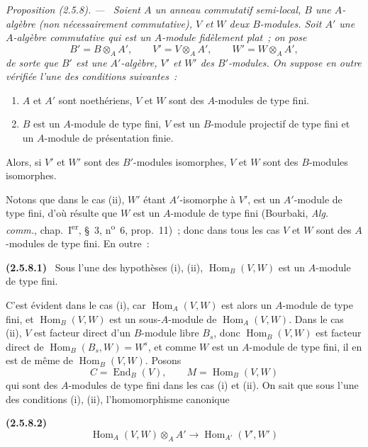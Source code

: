 \documentclass[10pt,oneside]{book}
\newenvironment{env}[1][]{\par\medskip\noindent\textbf{(#1)}\ }{\par}
\newenvironment{proposition}[1][]{%
  \par\medskip\noindent\itshape Proposition (#1). ---\ }{\par}
\begin{document}
\begin{proposition}[2.5.8]
\label{IV.2.5.8-fr}
Soient $A$ un anneau commutatif semi-local, $B$ une $A$-algèbre (non
nécessairement commutative), $V$ et $W$ deux $B$-modules. Soit $A'$ une
$A$-algèbre commutative qui est un $A$-module fidèlement plat~; on pose
\[
B'=B\otimes_A A',\qquad V'=V\otimes_A A',\qquad W'=W\otimes_A A',
\]
de sorte que $B'$ est une $A'$-algèbre, $V'$ et $W'$ des $B'$-modules. On
suppose en outre vérifiée l'une des conditions suivantes~:
\begin{enumerate}
\item[(i)] $A$ et $A'$ sont noethériens, $V$ et $W$ sont des $A$-modules de
type fini.
\item[(ii)] $B$ est un $A$-module de type fini, $V$ est un $B$-module
projectif de type fini et un $A$-module de présentation finie.
\end{enumerate}
Alors, si $V'$ et $W'$ sont des $B'$-modules isomorphes, $V$ et $W$ sont des
$B$-modules isomorphes.
\end{proposition}

Notons que dans le cas (ii), $W'$ étant $A'$-isomorphe à $V'$, est un
$A'$-module de type fini, d'où résulte que $W$ est un $A$-module de type fini
(Bourbaki, \emph{Alg. comm.}, chap.~I\textsuperscript{er}, \S~3,
n\textsuperscript{o}~6, prop.~11)~; donc dans tous les cas $V$ et $W$ sont
des $A$-modules de type fini. En outre~:

\begin{env}[2.5.8.1]
\label{IV.2.5.8.1-fr}
Sous l'une des hypothèses (i), (ii), $\operatorname{Hom}_B(V,W)$ est un
$A$-module de type fini.
\end{env}

C'est évident dans le cas (i), car $\operatorname{Hom}_A(V,W)$ est alors un
$A$-module de type fini, et $\operatorname{Hom}_B(V,W)$ est un sous-$A$-module
de $\operatorname{Hom}_A(V,W)$. Dans le cas (ii), $V$ est facteur direct d'un
$B$-module libre $B_s$, donc $\operatorname{Hom}_B(V,W)$ est facteur direct de
$\operatorname{Hom}_B(B_s,W)=W^s$, et comme $W$ est un $A$-module de type
fini, il en est de même de $\operatorname{Hom}_B(V,W)$. Posons
\[
C=\operatorname{End}_B(V),\qquad M=\operatorname{Hom}_B(V,W)
\]
qui sont des $A$-modules de type fini dans les cas (i) et (ii). On sait que
sous l'une des conditions (i), (ii), l'homomorphisme canonique

\begin{env}[2.5.8.2]
\label{IV.2.5.8.2-fr}
\[
\operatorname{Hom}_A(V,W)\otimes_A A'\longrightarrow
\operatorname{Hom}_{A'}(V',W')
\]
\end{env}
\end{document}

